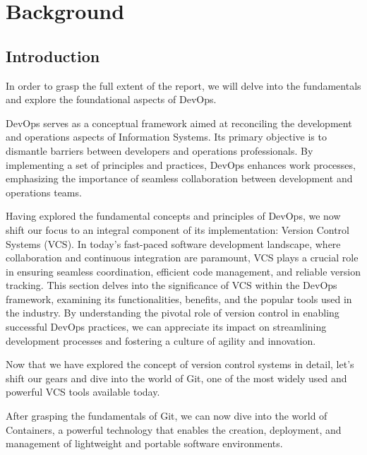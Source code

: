 \chapter*{Background}

\section*{Introduction}
In order to grasp the full extent of the report, we will delve into the fundamentals and explore the foundational aspects of DevOps.

DevOps serves as a conceptual framework aimed at reconciling the development and operations aspects of Information Systems. Its primary objective is to dismantle barriers between developers and operations professionals. By implementing a set of principles and practices, DevOps enhances work processes, emphasizing the importance of seamless collaboration between development and operations teams.\cite{diel2016communication}

Having explored the fundamental concepts and principles of DevOps, we now shift our focus to an integral component of its implementation: Version Control Systems (VCS). In today's fast-paced software development landscape, where collaboration and continuous integration are paramount, VCS plays a crucial role in ensuring seamless coordination, efficient code management, and reliable version tracking. This section delves into the significance of VCS within the DevOps framework, examining its functionalities, benefits, and the popular tools used in the industry. By understanding the pivotal role of version control in enabling successful DevOps practices, we can appreciate its impact on streamlining development processes and fostering a culture of agility and innovation.



Now that we have explored the concept of version control systems in detail, let's shift our gears and dive into the world of Git, one of the most widely used and powerful VCS tools available today.



After grasping the fundamentals of Git, we can now dive into the world of Containers, a powerful technology that enables the creation, deployment, and management of lightweight and portable software environments.


